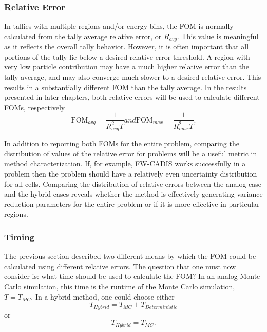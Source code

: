 \subsubsection{Relative Error}

In tallies with multiple regions and/or energy bins, the FOM is normally calculated
from the tally average relative error, or $R_{avg}$. This value is meaningful as
it reflects the overall tally behavior. However, it is often important that all
portions of the tally lie below a desired relative error threshold. A region
with very low particle contribution may have a much higher relative error than
the tally average, and may also converge much slower to a desired relative
error. This results in a substantially different FOM than
the tally average. In the results presented in later chapters, both relative
errors will be used to calculate different FOMs, respectively
\begin{subequations}
  \begin{equation}
    \text{FOM}_{avg} = \frac{1}{R_{avg}^{2}T}
  \label{eq:FOMavg}
  \end{equation}
and
  \begin{equation}
    \text{FOM}_{max} = \frac{1}{R_{max}^{2}T} .
  \label{eq:FOMmax}
  \end{equation}
  \label{eq:FOMerror}
\end{subequations}

In addition to reporting both FOMs for the entire problem, comparing the
distribution of values of the relative error for problems will be a useful
metric in method characterization. If, for example, FW-CADIS works successfully
in a problem then the problem should have a relatively even uncertainty
distribution for all cells. Comparing the distribution of relative errors
between the analog case and the hybrid cases reveals whether the method is
effectively generating variance reduction parameters for the entire problem or
if it is more effective in particular regions.

\subsubsection{Timing}

The previous section described two different means by which the FOM could be
calculated using different relative errors. The question that one must
now consider is: what time should be used to
calculate the FOM? In an analog Monte Carlo simulation, this time is the runtime
of the Monte Carlo simulation, $T = T_{MC}$. In a hybrid method, one could choose
either
\begin{equation}
  T_{Hybrid} = T_{MC} + T_{Deterministic}
\label{eq:hybridtime}
\end{equation}
or
\begin{equation}
  T_{Hybrid} = T_{MC} .
\end{equation}

